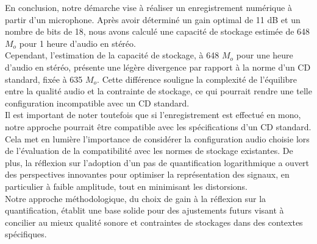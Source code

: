 En conclusion, notre démarche vise à réaliser un enregistrement numérique à partir d'un microphone. Après avoir déterminé un gain optimal de 11 dB et un nombre de bits de 18, nous avons calculé une capacité de stockage estimée de 648 $M_o$ pour 1 heure d'audio en stéréo.
\\

Cependant, l'estimation de la capacité de stockage, à 648 $M_o$ pour une heure d'audio en stéréo, présente une légère divergence par rapport à la norme d'un CD standard, fixée à 635 $M_o$. Cette différence souligne la complexité de l'équilibre entre la qualité audio et la contrainte de stockage, ce qui pourrait rendre une telle configuration incompatible avec un CD standard.
\\

Il est important de noter toutefois que si l'enregistrement est effectué en mono, notre approche pourrait être compatible avec les spécifications d'un CD standard. Cela met en lumière l'importance de considérer la configuration audio choisie lors de l'évaluation de la compatibilité avec les normes de stockage existantes. De plus, la réflexion sur l'adoption d'un pas de quantification logarithmique a ouvert des perspectives innovantes pour optimiser la représentation des signaux, en particulier à faible amplitude, tout en minimisant les distorsions.
\\

Notre approche méthodologique, du choix de gain à la réflexion sur la quantification, établit une base solide pour des ajustements futurs visant à concilier au mieux qualité sonore et contraintes de stockages dans des contextes spécifiques.